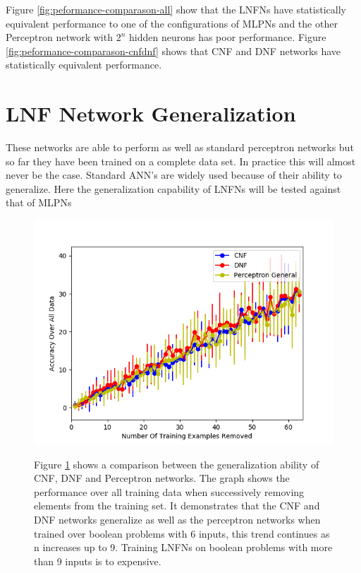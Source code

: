 Figure \ref{fig:peformance-comparason-all} show that the LNFNs have statistically equivalent performance to one of the configurations of MLPNs and the other Perceptron network with $2^n$ hidden neurons has poor performance. Figure \ref{fig:peformance-comparason-cnfdnf} shows that CNF and DNF networks have statistically equivalent performance. 

\section{LNF Network Generalization} \label{sec:lnfn-generalization}
These networks are able to perform as well as standard perceptron networks but so far they have been trained on a complete data set. In practice this will almost never be the case. Standard ANN's are widely used because of their ability to generalize. Here the generalization capability of LNFNs will be tested against that of MLPNs

\begin{figure}[H]
	\centering
	\begin{minipage}[t]{0.6\textwidth}
		\vspace{0px}
		\includegraphics[width=\textwidth]{6-generalization.png}
		\caption{}
		\label{fig:generalization-peformance-6}
	\end{minipage}
	\begin{minipage}[t]{0.39\textwidth}
	\vspace{0px}
		Figure \ref{fig:generalization-peformance-6} shows a comparison between the generalization ability of CNF, DNF and Perceptron networks. The graph shows the performance over all training data when successively removing elements from the training set. It demonstrates that the CNF and DNF networks generalize as well as the perceptron networks when trained over boolean problems with 6 inputs, this trend continues as n increases up to 9. Training LNFNs on boolean problems with more than 9 inputs is to expensive.		
	\end{minipage}
	\hfill
\end{figure}

